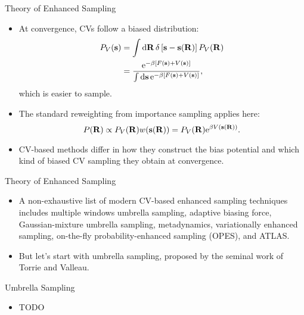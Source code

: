 \documentclass[10pt]{beamer}
\begin{document}
\begin{frame}{Theory of Enhanced Sampling}
\begin{itemize}
\setlength\itemsep{1em}
  \item At convergence, CVs follow a biased distribution:
  \begin{align}
      P_{V}(\mathbf{s}) &= \int \mathrm{d}\mathbf{R} \, \delta
    \left[
      \mathbf{s} - \mathbf{s}(\mathbf{R})
    \right]
  P_{V}(\mathbf{R}) \nonumber\\ &=
  \frac{ \mathrm{e}^{ -\beta\left[ F(\mathbf{s}) + V(\mathbf{s}) \right] } }
    {\int\mathrm{d}\mathbf{s} \, \mathrm{e}^{ -\beta\left[ F(\mathbf{s}) + V(\mathbf{s}) \right] } },
  \end{align}
  which is easier to sample.

  \item The standard reweighting from importance sampling applies here:
  \begin{equation}
    P({\bf R}) \propto P_V({\bf R}) w({\bf s}({\bf R})) = P_V({\bf R}) \mathrm{e}^{\beta V({\bf s}({\bf R}))}.
  \end{equation}

  \item CV-based methods differ in how they construct the bias potential and which kind of biased CV sampling they obtain at convergence.
\end{itemize}
\end{frame}

\begin{frame}{Theory of Enhanced Sampling}
\begin{itemize}
\setlength\itemsep{1em}
  \item A non-exhaustive list of modern CV-based enhanced sampling techniques includes multiple windows umbrella sampling, adaptive biasing force, Gaussian-mixture umbrella sampling, metadynamics, variationally enhanced sampling, on-the-fly probability-enhanced sampling (OPES), and ATLAS.

  \item But let's start with umbrella sampling, proposed by the seminal work of Torrie and Valleau.
\end{itemize}
\end{frame}

\begin{frame}{Umbrella Sampling}
\begin{itemize}
\setlength\itemsep{1em}
  \item TODO
\end{itemize}
\end{frame}
\end{document}
